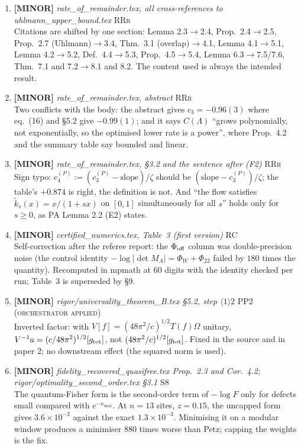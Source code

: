 \documentclass[11pt]{article}
\begin{document}
\begin{enumerate}[leftmargin=1.6em,itemsep=6pt]
\item \textbf{[MINOR]} \emph{rate\_of\_remainder.tex, all cross-references to uhlmann\_upper\_bound.tex} \hfill\textsc{RRr}\\ Citations are shifted by one section: Lemma 2.3$\to$2.4, Prop.\ 2.4$\to$2.5, Prop.\ 2.7 (Uhlmann)$\to$3.4, Thm.\ 3.1 (overlap)$\to$4.1, Lemma 4.1$\to$5.1, Lemma 4.2$\to$5.2, Def.\ 4.4$\to$5.3, Prop.\ 4.5$\to$5.4, Lemma 6.3$\to$7.5/7.6, Thm.\ 7.1 and 7.2$\to$8.1 and 8.2. The content used is always the intended result.
\item \textbf{[MINOR]} \emph{rate\_of\_remainder.tex, abstract} \hfill\textsc{RRr}\\ Two conflicts with the body: the abstract gives $c_3=-0.96(3)$ where eq.\ (16) and \S5.2 give $-0.99(1)$; and it says $C(\Lambda)$ ``grows polynomially, not exponentially, so the optimised lower rate is a power'', where Prop.\ 4.2 and the summary table say bounded and linear.
\item \textbf{[MINOR]} \emph{rate\_of\_remainder.tex, \S3.2 and the sentence after (F2)} \hfill\textsc{RRr}\\ Sign typo: $c_4^{(P)}:=(c_3^{(P)}-\mathrm{slope})/\zeta$ should be $(\mathrm{slope}-c_3^{(P)})/\zeta$; the table's $+0.874$ is right, the definition is not. And ``the flow satisfies $\widetilde k_s(x)=x/(1+sx)$ on $[0,1]$ simultaneously for all $s$'' holds only for $s\ge0$, as PA Lemma 2.2 (E2) states.
\item \textbf{[MINOR]} \emph{certified\_numerics.tex, Table~3 (first version)} \hfill\textsc{RC}\\ Self-correction after the referee report: the $\Phi_{\rm off}$ column was double-precision noise (the control identity $-\log\lvert\det M_A\rvert=\Phi_W+\Phi_{22}$ failed by $180$ times the quantity). Recomputed in mpmath at $60$ digits with the identity checked per run; Table~3 is superseded by \S9.
\item \textbf{[MINOR]} \emph{rigor/universality\_theorem\_B.tex \S5.2, step \(\langle1\rangle2\)} \hfill\textsc{PP2 (orchestrator applied)}\\ Inverted factor: with \(V[f]=(48\pi^2/c)^{1/2}T(f)\Omega\) unitary, \(V^{-1}a=(c/48\pi^2)^{1/2}[g_{\rm tot}]\), not \((48\pi^2/c)^{1/2}[g_{\rm tot}]\). Fixed in the source and in paper 2; no downstream effect (the squared norm is used).
\item \textbf{[MINOR]} \emph{fidelity\_recovered\_quasifree.tex Prop.~2.3 and Cor.~4.2; rigor/optimality\_second\_order.tex \S3.1} \hfill\textsc{S8}\\ The quantum-Fisher form is the second-order term of \(-\log F\) only for defects small compared with \(e^{-\kappa_{\max}}\). At \(n=13\) sites, \(z=0.15\), the uncapped form gives \(3.6\times10^{-2}\) against the exact \(1.3\times10^{-3}\). Minimising it on a modular window produces a minimiser \(880\) times worse than Petz; capping the weights is the fix.

\end{enumerate}
\end{document}
